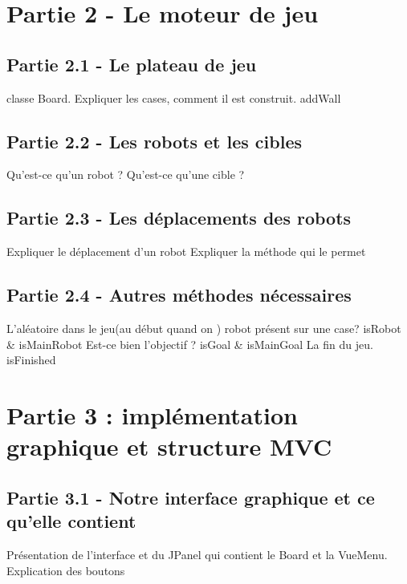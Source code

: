 \documentclass{beamer} %
\begin{document}
\section{Partie 2 - Le moteur de jeu}
	\subsection{Partie 2.1 - Le plateau de jeu}
\begin{frame}[plain]
classe Board. Expliquer les cases, 
comment il est construit. addWall
\end{frame}
	\subsection{Partie 2.2 - Les robots et les cibles}
\begin{frame}[plain]
Qu'est-ce qu'un robot ? %
Qu'est-ce qu'une cible ? %
\end{frame}
	\subsection{Partie 2.3 - Les déplacements des robots}
\begin{frame}[plain]
Expliquer le déplacement d'un robot
Expliquer la méthode qui le permet
\end{frame}
	\subsection{Partie 2.4 - Autres méthodes nécessaires}
\begin{frame}[plain]
L'aléatoire dans le jeu(au début quand on )
robot présent sur une case? isRobot \& isMainRobot
Est-ce bien l'objectif ? isGoal \& isMainGoal
La fin du jeu. isFinished
\end{frame}

\section{Partie 3 : implémentation graphique et structure MVC}
\begin{frame}[plain]
\end{frame}
	\subsection{Partie 3.1 - Notre interface graphique et ce qu'elle contient}
\begin{frame}[plain]
Présentation de l'interface et du JPanel qui contient le Board et la VueMenu.
Explication des boutons
\end{frame}
\end{document}
